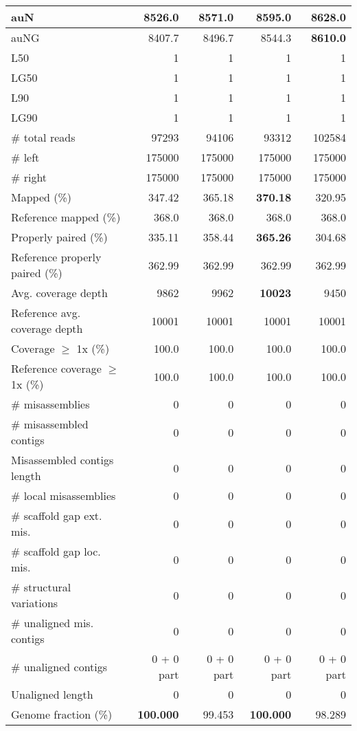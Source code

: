 \documentclass[12pt,a4paper]{article}
\begin{document}
\begin{table}[ht]
\begin{center}
\begin{tabular}{|l*{4}{|r}|}
auN & 8526.0 & 8571.0 & 8595.0 & {\bf 8628.0} \\ \hline
auNG & 8407.7 & 8496.7 & 8544.3 & {\bf 8610.0} \\ \hline
L50 & 1 & 1 & 1 & 1 \\ \hline
LG50 & 1 & 1 & 1 & 1 \\ \hline
L90 & 1 & 1 & 1 & 1 \\ \hline
LG90 & 1 & 1 & 1 & 1 \\ \hline
\# total reads & 97293 & 94106 & 93312 & 102584 \\ \hline
\# left & 175000 & 175000 & 175000 & 175000 \\ \hline
\# right & 175000 & 175000 & 175000 & 175000 \\ \hline
Mapped (\%) & 347.42 & 365.18 & {\bf 370.18} & 320.95 \\ \hline
Reference mapped (\%) & 368.0 & 368.0 & 368.0 & 368.0 \\ \hline
Properly paired (\%) & 335.11 & 358.44 & {\bf 365.26} & 304.68 \\ \hline
Reference properly paired (\%) & 362.99 & 362.99 & 362.99 & 362.99 \\ \hline
Avg. coverage depth & 9862 & 9962 & {\bf 10023} & 9450 \\ \hline
Reference avg. coverage depth & 10001 & 10001 & 10001 & 10001 \\ \hline
Coverage $\geq$ 1x (\%) & 100.0 & 100.0 & 100.0 & 100.0 \\ \hline
Reference coverage $\geq$ 1x (\%) & 100.0 & 100.0 & 100.0 & 100.0 \\ \hline
\# misassemblies & 0 & 0 & 0 & 0 \\ \hline
\# misassembled contigs & 0 & 0 & 0 & 0 \\ \hline
Misassembled contigs length & 0 & 0 & 0 & 0 \\ \hline
\# local misassemblies & 0 & 0 & 0 & 0 \\ \hline
\# scaffold gap ext. mis. & 0 & 0 & 0 & 0 \\ \hline
\# scaffold gap loc. mis. & 0 & 0 & 0 & 0 \\ \hline
\# structural variations & 0 & 0 & 0 & 0 \\ \hline
\# unaligned mis. contigs & 0 & 0 & 0 & 0 \\ \hline
\# unaligned contigs & 0 + 0 part & 0 + 0 part & 0 + 0 part & 0 + 0 part \\ \hline
Unaligned length & 0 & 0 & 0 & 0 \\ \hline
Genome fraction (\%) & {\bf 100.000} & 99.453 & {\bf 100.000} & 98.289 \\ \hline

\end{tabular}
\end{center}
\end{table}
\end{document}
